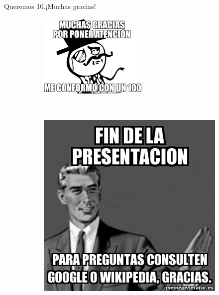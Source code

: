 \begin{frame}[fragile]{Queremos 10.}{¡Muchas gracias!}
  
  \begin{figure}
    \centering
    \begin{subfigure}[b]{0.4\textwidth}
      \includegraphics[width=\textwidth]{./Imagenes/Agradecimientos}
    \end{subfigure}
    ~ %
    \begin{subfigure}[b]{0.3\textwidth}
        \includegraphics[width=\textwidth]{./Imagenes/Fin}
    \end{subfigure}
    \end{figure}
\end{frame}
